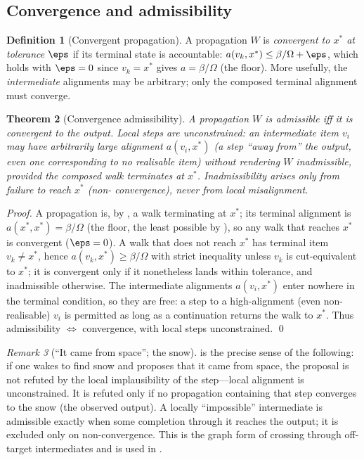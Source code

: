 \documentclass[11pt,a4paper]{article}
\theoremstyle{thmstyle}
\newtheorem{theorem}{Theorem}[section]
\theoremstyle{definition}
\newtheorem{definition}[theorem]{Definition}
\theoremstyle{remark}
\newtheorem{remark}[theorem]{Remark}
\newcommand{\flo}{\beta}                 %
\begin{document}
\subsection{Convergence and admissibility}

\begin{definition}[Convergent propagation]
\label{def:convergent}
A propagation $W$ is \emph{convergent to $x^{\ast}$ at tolerance $\eps$} if
its terminal state is accountable: $a(v_k,x^{\ast})\le\flo/\Omega+\eps$,
which holds with $\eps=0$ since $v_k=x^{\ast}$ gives $a=\flo/\Omega$
(the floor). More usefully, the \emph{intermediate} alignments may be
arbitrary; only the composed terminal alignment must converge.
\end{definition}

\begin{theorem}[Convergence admissibility]
\label{thm:admissibility}
A propagation $W$ is \emph{admissible} iff it is convergent to the output.
Local steps are unconstrained: an intermediate item $v_i$ may have
arbitrarily large alignment $a(v_i,x^{\ast})$ (a step ``away from'' the
output, even one corresponding to no realisable item) without rendering
$W$ inadmissible, provided the composed walk terminates at $x^{\ast}$.
Inadmissibility arises only from failure to reach $x^{\ast}$ (non-%
convergence), never from local misalignment.
\end{theorem}

\begin{proof}
A propagation is, by , a walk terminating at
$x^{\ast}$; its terminal alignment is $a(x^{\ast},x^{\ast})=\flo/\Omega$
(the floor, the least possible by ), so any walk
that reaches $x^{\ast}$ is convergent ($\eps=0$). A walk that does not
reach $x^{\ast}$ has terminal item $v_k\neq x^{\ast}$, hence
$a(v_k,x^{\ast})\ge\flo/\Omega$ with strict inequality unless $v_k$ is
cut-equivalent to $x^{\ast}$; it is convergent only if it nonetheless lands
within tolerance, and inadmissible otherwise. The intermediate alignments
$a(v_i,x^{\ast})$ enter nowhere in the terminal condition, so they are
free: a step to a high-alignment (even non-realisable) $v_i$ is permitted
as long as a continuation returns the walk to $x^{\ast}$. Thus
admissibility $\iff$ convergence, with local steps unconstrained. \qed
\end{proof}

\begin{remark}[``It came from space''; the snow]
\label{rem:snow}
 is the precise sense of the following: if one
wakes to find snow and proposes that it came from space, the proposal is
not refuted by the local implausibility of the step---local alignment is
unconstrained. It is refuted only if no propagation containing that step
converges to the snow (the observed output). A locally ``impossible''
intermediate is admissible exactly when some completion through it reaches
the output; it is excluded only on non-convergence. This is the graph form
of crossing through off-target intermediates and is used in
.
\end{remark}
\end{document}
